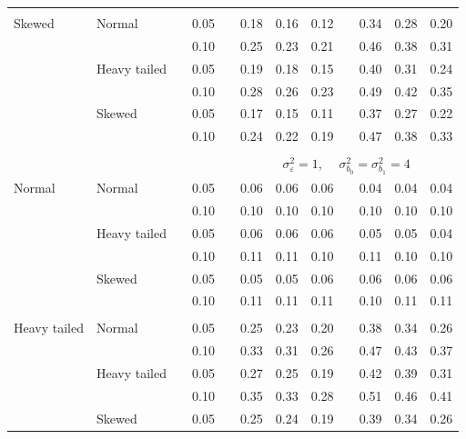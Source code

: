 \documentclass[12pt]{article} %
\begin{document}
\begin{table}[ht]
\begin{scriptsize}
\begin{center}
\begin{tabular}{ll p{.1cm} c p{.1cm} rrr p{.1cm} rrr}
             &&&&&&&&&&&\\
Skewed       & Normal       && 0.05 &&   0.18 & 0.16 & 0.12 && 0.34 & 0.28 & 0.20 \\ 
             &              && 0.10 &&   0.25 & 0.23 & 0.21 && 0.46 & 0.38 & 0.31 \\ 
             & Heavy tailed && 0.05 &&   0.19 & 0.18 & 0.15 && 0.40 & 0.31 & 0.24 \\ 
             &              && 0.10 &&   0.28 & 0.26 & 0.23 && 0.49 & 0.42 & 0.35 \\ 
             & Skewed       && 0.05 &&   0.17 & 0.15 & 0.11 && 0.37 & 0.27 & 0.22 \\ 
             &              && 0.10 &&   0.24 & 0.22 & 0.19 && 0.47 & 0.38 & 0.33 \\ 


&&&&&&&&&&&\\
& && && \multicolumn{7}{c}{$\sigma_{\varepsilon}^2 = 1$, \ \ $\sigma_{b_0}^2 = \sigma_{b_1}^2 = 4$} \\ \cline{6-12}
\rowcolor{gray!20}Normal       & Normal       && 0.05 &&  0.06 & 0.06 & 0.06 && 0.04 & 0.04 & 0.04 \\ 
\rowcolor{gray!20}             &              && 0.10 &&  0.10 & 0.10 & 0.10 && 0.10 & 0.10 & 0.10 \\ 
\rowcolor{gray!20}             & Heavy tailed && 0.05 &&  0.06 & 0.06 & 0.06 && 0.05 & 0.05 & 0.04 \\ 
\rowcolor{gray!20}             &              && 0.10 &&  0.11 & 0.11 & 0.10 && 0.11 & 0.10 & 0.10 \\ 
\rowcolor{gray!20}             & Skewed       && 0.05 &&  0.05 & 0.05 & 0.06 && 0.06 & 0.06 & 0.06 \\ 
\rowcolor{gray!20}             &              && 0.10 &&  0.11 & 0.11 & 0.11 && 0.10 & 0.11 & 0.11 \\ 
             &&&&&&&&&&&\\
Heavy tailed & Normal       && 0.05 &&  0.25 & 0.23 & 0.20 && 0.38 & 0.34 & 0.26 \\ 
             &              && 0.10 &&  0.33 & 0.31 & 0.26 && 0.47 & 0.43 & 0.37 \\ 
             & Heavy tailed && 0.05 &&  0.27 & 0.25 & 0.19 && 0.42 & 0.39 & 0.31 \\ 
             &              && 0.10 &&  0.35 & 0.33 & 0.28 && 0.51 & 0.46 & 0.41 \\ 
             & Skewed       && 0.05 &&  0.25 & 0.24 & 0.19 && 0.39 & 0.34 & 0.26 \\ 

\end{tabular}
\end{center}
\end{scriptsize}
\end{table}
\end{document}
